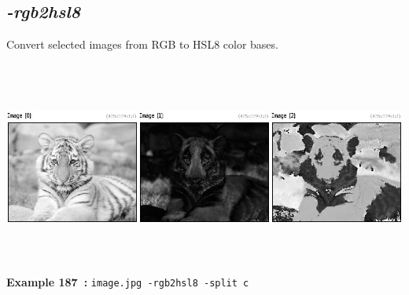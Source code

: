 \documentclass[a4paper,11pt,twoside]{book}
\begin{document}
\subsection{\emph{-rgb2hsl8} }\vspace*{-0.5em}
Convert selected images from RGB to HSL8 color bases.
\begin{center}\includegraphics[keepaspectratio=true,height=7cm,width=\textwidth]{img/gmic_def187.jpg}\\
{\footnotesize \textbf{Example 187~:} \texttt{image.jpg -rgb2hsl8 -split c}}
\end{center}
\end{document}
